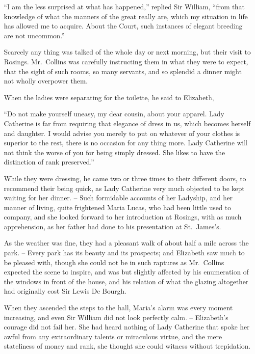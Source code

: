 “I am the less surprised at what has happened,”
replied Sir William, “from that knowledge of what the
manners of the great really are, which my situation in
life has allowed me to acquire. About the Court, such
instances of elegant breeding are not uncommon.”

Scarcely any thing was talked of the whole day or next
morning, but their visit to Rosings. Mr.\ Collins was
carefully instructing them in what they were to expect,
that the sight of such rooms, so many servants, and so
splendid a dinner might not wholly overpower them.

When the ladies were separating for the toilette, he said
to Elizabeth,

“Do not make yourself uneasy, my dear cousin, about
your apparel. Lady Catherine is far from requiring that
elegance of dress in us, which becomes herself and daughter.
I would advise you merely to put on whatever of your
clothes is superior to the rest, there is no occasion for
any thing more. Lady Catherine will not think the worse
of you for being simply dressed. She likes to have the
distinction of rank preserved.”

While they were dressing, he came two or three times
to their different doors, to recommend their being quick,
as Lady Catherine very much objected to be kept waiting
for her dinner. -- Such formidable accounts of her Ladyship,
and her manner of living, quite frightened Maria Lucas,
who had been little used to company, and she looked
forward to her introduction at Rosings, with as much
apprehension, as her father had done to his presentation
at St.\ James’s.

As the weather was fine, they had a pleasant walk of
about half a mile across the park. -- Every park has its
beauty and its prospects; and Elizabeth saw much to
be pleased with, though she could not be in such raptures
as Mr.\ Collins expected the scene to inspire, and was but
slightly affected by his enumeration of the windows in
front of the house, and his relation of what the glazing
altogether had originally cost Sir Lewis De Bourgh.

When they ascended the steps to the hall, Maria’s
alarm was every moment increasing, and even Sir William
did not look perfectly calm. -- Elizabeth’s courage did not
fail her. She had heard nothing of Lady Catherine that
spoke her awful from any extraordinary talents or miraculous
virtue, and the mere stateliness of money and rank,
she thought she could witness without trepidation.

